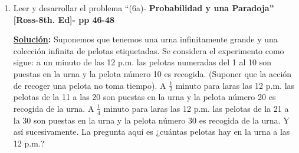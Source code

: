 \documentclass[11pt,letterpaper]{report}
\newcommand{\sol}{\textbf{\underline{Solución}: }} %
\begin{document}
\begin{enumerate}
\begin{proof}
\underline{Paso inductivo:} Para $n=m+1$.

Sean $A_1, \ldots, A_{m+1}$ eventos. Definimos $A = \bigcup_{i=1}^{m} A_i$ y $B = A_{m+1}$ y usando
el teorema previo $(*)$, podemos decir que:
\begin{equation}
    P(\bigcup_{i=1}^{n} A_i) = P(A \cup B) = P(A) + P(B) - P(A \cup B) \tag{3}
\end{equation}

Se ha asumido que $P(A)$ es igual a $(\heartsuit)$ con $n=m$. Se necesita mostrar que cuando sumamos
$P(A)$ a $P(B) - P(A \cap B)$ se obtiene $(\heartsuit)$ con $n=m+1$. La diferencia entre
$(\heartsuit)$ con $n=m+1$ y $P(A)$ son todos los términos en que cada uno de los índices 
$(i,j,k,\ldots)$ son iguales a $m+1$. Esos términos son los siguientes
\begin{equation}
    P(A_{m+1}) - \sum_{i=1}^{m} P(A_i \cap A_{m+1}) + \sum_{i < j} P(A_i \cap A_j \cap A_{m+1}) +
    \ldots + (-1)^{m+2} P(A_1 \cap A_2 \cap \cdots \cap A_m \cap A_{m+1}) \tag{4}
\end{equation}

El primer término en $(4)$ es $P(B) = P(A_{m+1})$. Todo lo que queda es mostrar que $-P(A \cup B)$
es igual a todos, pero el primer término en $(4)$.

Usando la generalización de la propiedad distributiva, para escribir que:
\[
    A \cap B = (\bigcup_{i=1}^m A_i) \cap A_{m+1} = \bigcup_{i=1}^{m} (A_i \cap A_{m+1}) \tag{5}
\]

La unión en $(5)$ contiene $m$ eventos, y por tanto podemos aplicar $(\heartsuit)$ con $n=m$ y cada
$A_i$ reemplazada por $A_i \cap A_{m+1}$. El resultado es que $-P(A \cap B)$ es igual a todos,
excepto el primer término en $(4)$.
\end{proof}


\item Leer y desarrollar el problema ``(6a)- \textbf{Probabilidad y una Paradoja''
[Ross-8th. Ed]- pp 46-48}

\sol Suponemos que tenemos una urna infinitamente grande y una colección infinita de pelotas
etiquetadas. Se considera el experimento como sigue: a un minuto de las 12 p.m. las pelotas
numeradas del 1 al 10 son puestas en la urna y la pelota número 10 es recogida. (Suponer que la
acción de recoger una pelota no toma tiempo). A $\frac{1}{2}$ minuto para laras las 12 p.m. las 
pelotas de la 11 a las 20 son puestas en la urna y la pelota número 20 es recogida de la urna.
A $\frac{1}{4}$ minuto para laras las 12 p.m. las  pelotas de la 21 a la 30 son puestas en la urna y
la pelota número 30 es recogida de la urna. Y así sucesivamente. La pregunta aquí es ¿cuántas
pelotas hay en la urna a las 12 p.m.?


\end{enumerate}
\end{document}
